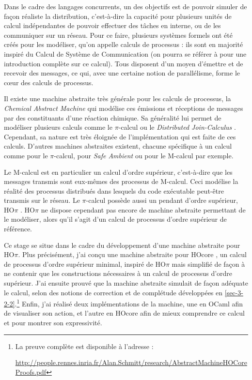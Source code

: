 \documentclass[11pt]{article}
\begin{document}
Dans le cadre des langages concurrents, un des objectifs est de pouvoir simuler de façon réaliste la distribution, c'est-à-dire la capacité pour plusieurs unités de calcul indépendantes de pouvoir effectuer des tâches en interne, ou de les communiquer sur un réseau.
Pour ce faire, plusieurs systèmes formels ont été créés pour les modéliser, qu'on appelle calculs de processus : ils sont en majorité inspiré du Calcul de Système de Communication (on pourra se référer à \cite{Milner82} pour une introduction complète sur ce calcul).
Tous disposent d'un moyen d'émettre et de recevoir des messages, ce qui, avec une certaine notion de parallélisme, forme le c\oe ur des calculs de processus.

Il existe une machine abstraite très générale pour les calculs de processus, la \emph{Chemical Abstract Machine} \cite{Berry92} qui modélise ces émissions et réceptions de messages par des constituants d'une réaction chimique. Sa généralité lui permet de modéliser plusieurs calculs comme le $\pi$-calcul \cite{Gonthier96} ou le \emph{Distributed Join-Calculus} \cite{Fournet96}.
Cependant, sa nature est très éloignée de l'implémentation qui est faite de ces calculs.
D'autres machines abstraites existent, chacune spécifique à un calcul comme \cite{Bidinger09} pour le $\pi$-calcul, \cite{Sangiorgi01} pour \emph{Safe Ambient} ou \cite{Germain02} pour le M-calcul par exemple.

Le M-calcul est en particulier un calcul d'ordre supérieur, c'est-à-dire que les messages transmis sont eux-mêmes des processus de M-calcul. Ceci modélise la réalité des processus distribués dans lesquels du code exécutable peut-être transmis sur le réseau.
Le $\pi$-calcul possède aussi un pendant d'ordre supérieur, HO$\pi$ \cite{Sangiorgi93}.
HO$\pi$ ne dispose cependant pas encore de machine abstraite permettant de le modéliser, alors qu'il s'agit d'un calcul de processus d'ordre supérieur de référence.

Ce stage se situe dans le cadre du développement d'une machine abstraite pour HO$\pi$. Plus précisément, j'ai conçu une machine abstraite pour HOcore \cite{Lanese08}, un calcul de processus d'ordre supérieur minimal, inspiré de HO$\pi$ mais simplifié de façon à ne contenir que les constructions nécessaires à un calcul de processus d'ordre supérieur.
J'ai ensuite prouvé que la machine abstraite simulait de façon adéquate le calcul, selon des notions de correction et de complétude développées en \ref{sec-3-2-2}.\footnote{La preuve complète est disponible à l'adresse :
	
\url{http://people.rennes.inria.fr/Alan.Schmitt/research/AbstractMachineHOCoreProofs.pdf}}
Enfin, j'ai réalisé deux implémentations de la machine, une en OCaml afin de visualiser son action, et l'autre en HOcore afin de mieux comprendre ce calcul et pour montrer son expressivité.
\end{document}
